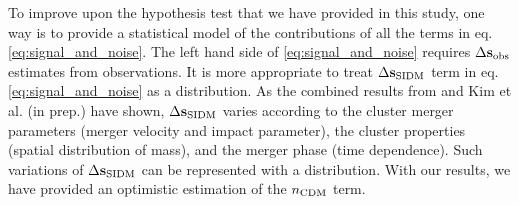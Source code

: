 To improve upon the hypothesis test that we have provided in this study, 
one way is to provide a statistical model of 
the contributions of all the terms in eq. \ref{eq:signal_and_noise}.
The left hand side of \ref{eq:signal_and_noise} requires $\Delta {\bf s}_{\rm obs}$ estimates from
observations. 
It is more appropriate to treat $\Delta {\bf s}_{\rm SIDM}$ term in eq. \ref{eq:signal_and_noise} 
as a distribution.
As the combined results from \cite{Kahlhoefer14} and Kim et al. (in prep.) have shown,
$\Delta {\bf s}_{\rm SIDM}$ varies according to the cluster merger parameters (merger
velocity and impact parameter),
the cluster properties (spatial distribution of mass), 
and the merger phase (time dependence). 
Such variations of $\Delta {\bf s}_{\rm SIDM}$ can be represented with a distribution.  
With our results, we have provided an optimistic estimation of the $n_{\rm CDM}$ term.

